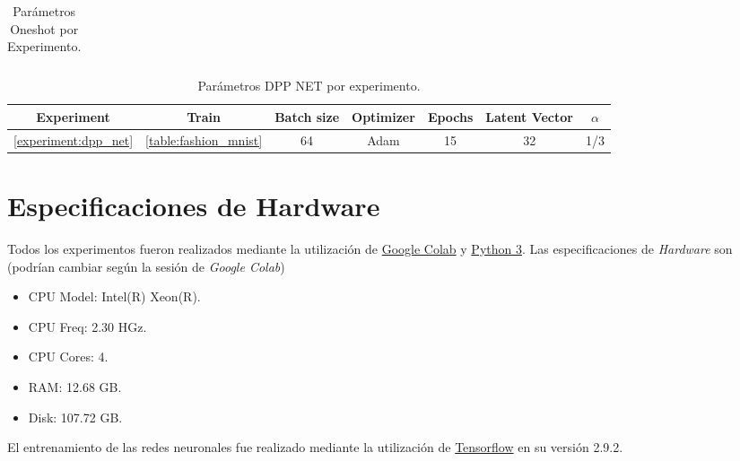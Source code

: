 \begin{appendixs}
\begin{table}[ht]
\begin{tabular}{|c|c|c|c|c|c|c|}
    \end{tabular}
    \caption{Parámetros Oneshot por Experimento.}
    \label{table:oneshot_parameters}
    \end{table}
    
    
    \begin{table}[ht]
    \begin{tabular}{|c|c|c|c|c|c|c|}
    \hline
    Experiment & Train & Batch size & Optimizer & Epochs & Latent Vector & $\alpha$ \\ \hline
    \ref{experiment:dpp_net}      & \ref{table:fashion_mnist}    & 64       & Adam      & 15     & 32                & 1/3         \\ \hline
    
    \end{tabular}
    \caption{Parámetros DPP NET por experimento.}
    \label{table:dppnet_parameters}
    \end{table}
    
    \section{Especificaciones de Hardware}
    
    Todos los experimentos fueron realizados mediante la utilización de \href{https://colab.research.google.com/?hl=es}{Google Colab} y \href{https://www.python.org}{Python 3}. Las especificaciones de \textit{Hardware} son (podrían cambiar según la sesión de \textit{Google Colab})
    
    \begin{itemize}
        \item CPU Model: Intel(R) Xeon(R).
        \item CPU Freq: 2.30 HGz.
        \item CPU Cores: 4.
        \item RAM: 12.68 GB.
        \item Disk: 107.72 GB.
    \end{itemize}
    
    El entrenamiento de las redes neuronales fue realizado mediante la utilización de \href{https://www.tensorflow.org}{Tensorflow} en su versión 2.9.2. 

  
    

    
    
    
    
    
    

    
    
\end{appendixs}